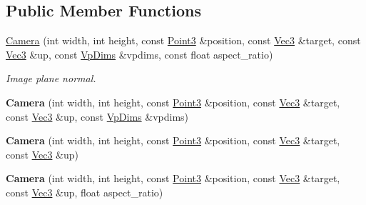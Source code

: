 \subsection*{Public Member Functions}
\begin{DoxyCompactItemize}
\item 
\mbox{\label{classomg_1_1_camera_a9c62e23a47414cc9838222f69b37ca8f}} 
\mbox{\hyperlink{classomg_1_1_camera_a9c62e23a47414cc9838222f69b37ca8f}{Camera}} (int width, int height, const \mbox{\hyperlink{namespaceomg_af3df7d66f0c70fe64649fcbe00edba5e}{Point3}} \&position, const \mbox{\hyperlink{namespaceomg_acf927839a305877d454c507f0b96730b}{Vec3}} \&target, const \mbox{\hyperlink{namespaceomg_acf927839a305877d454c507f0b96730b}{Vec3}} \&up, const \mbox{\hyperlink{structomg_1_1_camera_1_1_vp_dims}{Vp\+Dims}} \&vpdims, const float aspect\+\_\+ratio)
\begin{DoxyCompactList}\small\item\em Image plane normal. \end{DoxyCompactList}\item 
\mbox{\label{classomg_1_1_camera_ab538762b7a5ab089146209f1325dde59}} 
{\bfseries Camera} (int width, int height, const \mbox{\hyperlink{namespaceomg_af3df7d66f0c70fe64649fcbe00edba5e}{Point3}} \&position, const \mbox{\hyperlink{namespaceomg_acf927839a305877d454c507f0b96730b}{Vec3}} \&target, const \mbox{\hyperlink{namespaceomg_acf927839a305877d454c507f0b96730b}{Vec3}} \&up, const \mbox{\hyperlink{structomg_1_1_camera_1_1_vp_dims}{Vp\+Dims}} \&vpdims)
\item 
\mbox{\label{classomg_1_1_camera_a5812def5e5ccf91b585467d4bd899306}} 
{\bfseries Camera} (int width, int height, const \mbox{\hyperlink{namespaceomg_af3df7d66f0c70fe64649fcbe00edba5e}{Point3}} \&position, const \mbox{\hyperlink{namespaceomg_acf927839a305877d454c507f0b96730b}{Vec3}} \&target, const \mbox{\hyperlink{namespaceomg_acf927839a305877d454c507f0b96730b}{Vec3}} \&up)
\item 
\mbox{\label{classomg_1_1_camera_a4640624d27e5994e910da36d4cb0aef8}} 
{\bfseries Camera} (int width, int height, const \mbox{\hyperlink{namespaceomg_af3df7d66f0c70fe64649fcbe00edba5e}{Point3}} \&position, const \mbox{\hyperlink{namespaceomg_acf927839a305877d454c507f0b96730b}{Vec3}} \&target, const \mbox{\hyperlink{namespaceomg_acf927839a305877d454c507f0b96730b}{Vec3}} \&up, float aspect\+\_\+ratio)

\end{DoxyCompactItemize}
